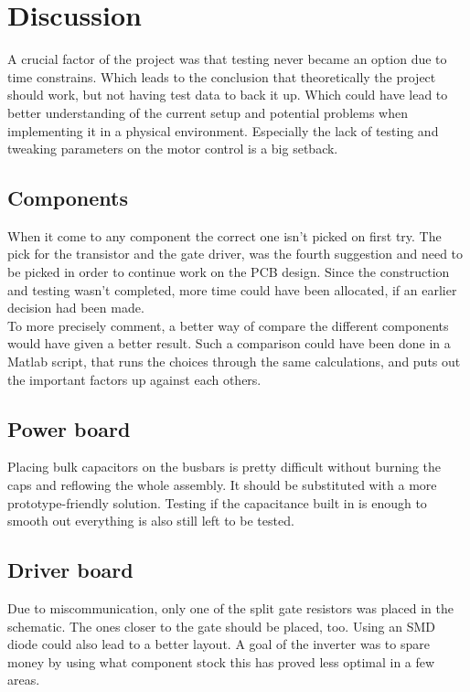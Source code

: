 \section{Discussion}
\label{sec:discussion}
 

A crucial factor of the project was that testing never became an option due to time constrains. Which leads to the conclusion that theoretically the project should work, but not having test data to back it up. 
Which could have lead to better understanding of the current setup and potential problems when implementing it in a physical environment. 
Especially the lack of testing and tweaking parameters on the motor control is a big setback.

\subsection{Components}
When it come to any component the correct one isn't picked on first try. The pick for the transistor and the gate driver, was the fourth suggestion and need to be picked in order to continue work on the PCB design. Since the construction and testing wasn't completed, more time could have been allocated, if an earlier decision had been made. \\

To more precisely comment, a better way of compare the different components would have given a better result. Such a comparison could have been done in a Matlab script, that runs the choices through the same calculations, and puts out the important factors up against each others. \\

\subsection{Power board}
Placing bulk capacitors on the busbars is pretty difficult without burning the caps and reflowing the whole assembly. It should be substituted with a more prototype-friendly solution. Testing if the capacitance built in is enough to smooth out everything is also still left to be tested.

\subsection{Driver board}
Due to miscommunication, only one of the split gate resistors was placed in the schematic. The ones closer to the gate should be placed, too. Using an SMD diode could also lead to a better layout. A goal of the inverter was to spare money by using what component stock this has proved less optimal in a few areas.


